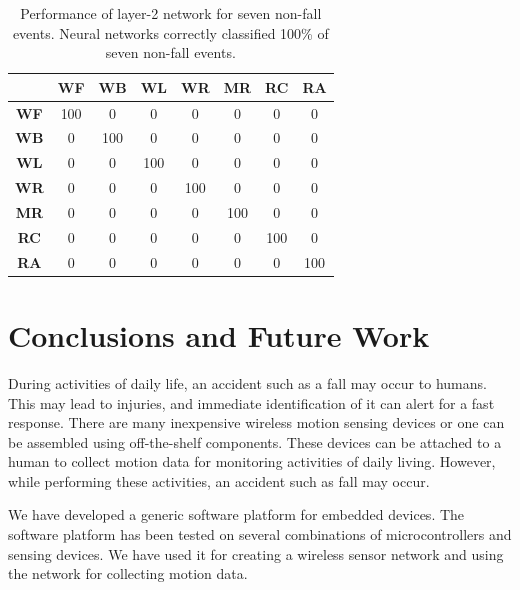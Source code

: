 \documentclass[]{IEEEtran}
\begin{document}
\begin{table}[htb]
\caption{Performance of layer-2 network for  seven non-fall events. Neural networks correctly classified 100\% of  seven non-fall events.}
\label{Layer2NonFallEventsNeuralNets}
\centering
{
\begin{tabular}{|c|c|c|c|c|c|c|c|}
\hline 
 & \textbf{WF} & \textbf{WB} & \textbf{WL} & \textbf{WR} & \textbf{MR} & 
\textbf{RC} & \textbf{RA} \\ \hline 
\textbf{WF} & 100 &  0 &  0 &  0 &  0 &  0 &  0 \\ \hline
\textbf{WB} & 0 &  100 &  0 &  0 &  0 &  0 &  0 \\ \hline
\textbf{WL} & 0 &  0 &  100 &  0 &  0 &  0 &  0 \\ \hline
\textbf{WR} & 0 &  0 &  0 &  100 &  0 &  0 &  0 \\ \hline
\textbf{MR} & 0 &  0 &  0 &  0 &  100 &  0 &  0 \\ \hline
\textbf{RC} & 0 &  0 &  0 &  0 &  0 &  100 &  0 \\ \hline
\textbf{RA} & 0 &  0 &  0 &  0 &  0 &  0 &  100 \\ \hline
\end{tabular}
}
\end{table}



\section{Conclusions and Future Work}

During activities of daily life, an accident 
such as a fall may occur to humans. This may lead to injuries, and immediate identification of it can alert for a fast response.  There are many inexpensive wireless motion sensing devices or one can be assembled using off-the-shelf components. These devices can be attached to a human to collect motion data for monitoring activities of daily living. However, while performing these activities, an accident such as fall may occur.

We have developed a generic software platform for embedded devices. The software platform has been tested on several combinations of microcontrollers and sensing devices. We have used it for creating a wireless sensor network and using the network for collecting motion data.
\end{document}

